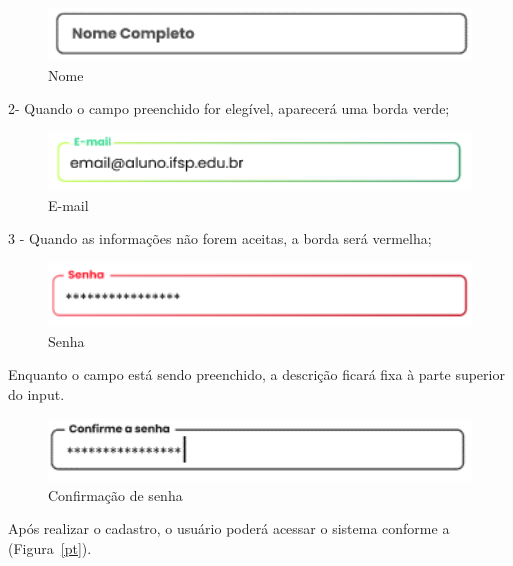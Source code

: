 \documentclass[12pt,a4paper]{article}
\begin{document}
\begin{itemize}
             \begin{figure}[H]
                            \centering
                            \includegraphics[width=15cm]{prot12.png}
                            \caption{Nome}
                        \end{figure} 
        2- Quando o campo preenchido for elegível, aparecerá uma borda verde; 
                \begin{figure}[H]
                                \centering
                                \includegraphics[width=15cm]{prot13.png}
                                \caption{E-mail}
                            \end{figure} 
        3 - Quando as informações não forem aceitas, a borda será vermelha; 
                \begin{figure}[H]
                                \centering
                                \includegraphics[width=15cm]{prot14.png}
                                \caption{Senha}
                            \end{figure} 
        Enquanto o campo está sendo preenchido, a descrição ficará fixa à parte superior do input.
                 \begin{figure}[H]
                                \centering
                                \includegraphics[width=15cm]{prot15.png}
                                \caption{Confirmação de senha}
                            \end{figure}
        Após realizar o cadastro, o usuário poderá acessar o sistema conforme a (Figura~\ref{pt}).
\end{itemize}
    
\end{document}
